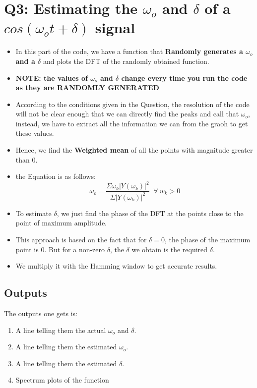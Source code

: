 \documentclass[11pt]{article}
\begin{document}
\section{Q3: Estimating the $\omega _o$ and $\delta$ of a $cos(\omega _ot+\delta)$ signal}
\begin{itemize}
    \item In this part of the code, we have a function that \textbf{Randomly generates a $\omega _o$ and a $\delta$} and plots the DFT of the randomly obtained function.
    \item \textbf{NOTE: the values of $\omega _o$ and $\delta$ change every time you run the code as they are RANDOMLY GENERATED}
    \item According to the conditions given in the Question, the resolution of the code will not be clear enough that we can directly find the peaks and call that $\omega _o$, instead, we have to extract all the information we can from the graoh to get these values.
    \item Hence, we find the \textbf{Weighted mean} of all the points with magnitude greater than 0.
    \item the Equation is as follows:
    \begin{equation}
        \omega _o= \frac{\Sigma \omega _k|Y(\omega _k)|^2}{\Sigma |Y(\omega _k)|^2} \;\; \forall\:w _k>0
    \end{equation}
    \item To estimate $\delta$, we just find the phase of the DFT at the points close to the point of maximum amplitude.
    \item This approach is based on the fact that for $\delta=0$, the phase of the maximum point is 0. But for a non-zero $\delta$, the $\delta$ we obtain is the required $\delta$.
    \item We multiply it with the Hamming window to get accurate results.
\end{itemize}

\subsection{Outputs}
The outputs one gets is:
\begin{enumerate}
    \item A line telling them the actual $\omega _o$ and $\delta$.
    \item A line telling them the estimated $\omega _o$.
    \item A line telling them the estimated $\delta$.
    \item Spectrum plots of the function
\end{enumerate}
\end{document}
